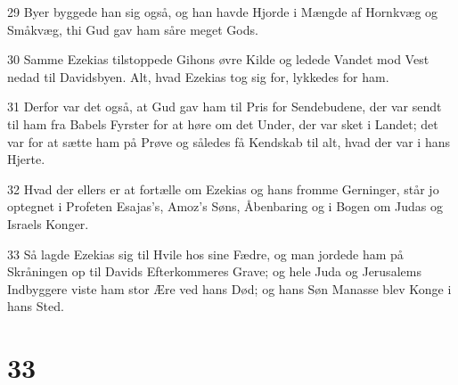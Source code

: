\par 29 Byer byggede han sig også, og han havde Hjorde i Mængde af Hornkvæg og Småkvæg, thi Gud gav ham såre meget Gods.
\par 30 Samme Ezekias tilstoppede Gihons øvre Kilde og ledede Vandet mod Vest nedad til Davidsbyen. Alt, hvad Ezekias tog sig for, lykkedes for ham.
\par 31 Derfor var det også, at Gud gav ham til Pris for Sendebudene, der var sendt til ham fra Babels Fyrster for at høre om det Under, der var sket i Landet; det var for at sætte ham på Prøve og således få Kendskab til alt, hvad der var i hans Hjerte.
\par 32 Hvad der ellers er at fortælle om Ezekias og hans fromme Gerninger, står jo optegnet i Profeten Esajas's, Amoz's Søns, Åbenbaring og i Bogen om Judas og Israels Konger.
\par 33 Så lagde Ezekias sig til Hvile hos sine Fædre, og man jordede ham på Skråningen op til Davids Efterkommeres Grave; og hele Juda og Jerusalems Indbyggere viste ham stor Ære ved hans Død; og hans Søn Manasse blev Konge i hans Sted.

\chapter{33}

